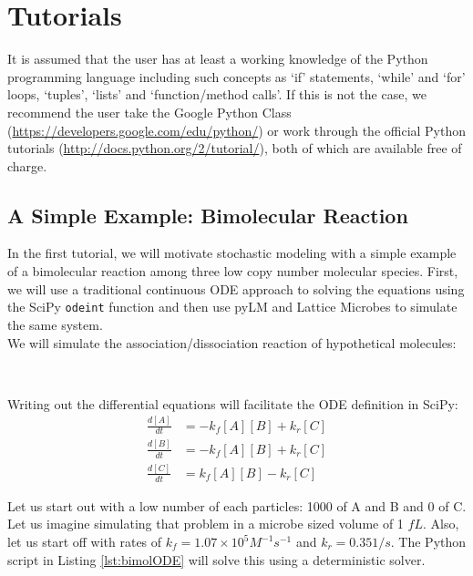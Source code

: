 \chapter{Tutorials}

It is assumed that the user has at least a working knowledge of the Python programming language including such concepts as `if' statements, `while' and `for' loops, `tuples', `lists' and `function/method calls'.  If this is not the case, we recommend the user take the Google Python Class (\url{https://developers.google.com/edu/python/}) or work through the official Python tutorials (\url{http://docs.python.org/2/tutorial/}), both of which are available free of charge.

\section{A Simple Example: Bimolecular Reaction}

In the first tutorial, we will motivate stochastic modeling with a simple example of a bimolecular reaction among three low copy number molecular species.  First, we will use a traditional continuous ODE approach to solving the equations using the SciPy \texttt{odeint} function and then use pyLM and Lattice Microbes to simulate the same system.\\

We will simulate the association/dissociation reaction of hypothetical molecules:\\

\begin{centering}
\\
\end{centering}

Writing out the differential equations will facilitate the ODE definition in SciPy:
\begin{align*}
\frac{d[A]}{dt}&=-k_f[A][B]+k_r[C]\\
\frac{d[B]}{dt}&=-k_f[A][B]+k_r[C]\\
\frac{d[C]}{dt}&=k_f[A][B]-k_r[C]
\end{align*}

Let us start out with a low number of each particles: 1000 of A and B and 0 of C.  Let us imagine simulating that problem in a microbe sized volume of 1 $fL$. Also, let us start off with rates of $k_f=1.07\times 10^5M^{-1}s^{-1}$ and $k_r=0.351/s$.  The Python script in Listing \ref{lst:bimolODE} will solve this using a deterministic solver.


